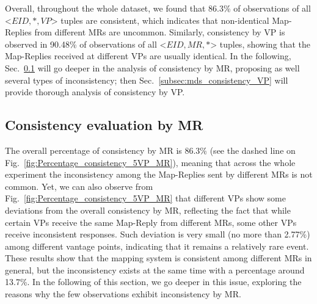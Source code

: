 Overall, throughout the whole dataset, we found that 86.3\% of observations of all <$EID, *, VP$> tuples are consistent, which indicates that non-identical Map-Replies from different MRs are uncommon. Similarly, consistency by VP is observed in 90.48\% of observations of all <$EID, MR, * $> tuples, showing that the Map-Replies received at different VPs are usually identical. In the following, Sec.~\ref{subsec:mds_consistency_MR} will go deeper in the analysis of consistency by MR, proposing as well several types of inconsistency; then Sec.~\ref{subsec:mds_consistency_VP} will provide thorough analysis of consistency by VP.


\subsection{Consistency evaluation by MR}
\label{subsec:mds_consistency_MR}

The overall percentage of consistency by MR is 86.3\% (see the dashed line on Fig.~\ref{fig:Percentage_consistency_5VP_MR}), meaning that across the whole experiment the inconsistency among the Map-Replies sent by different MRs is not common. Yet, we can also observe from Fig.~\ref{fig:Percentage_consistency_5VP_MR} that different VPs show some deviations from the overall consistency by MR, reflecting the fact that while certain VPs receive the same Map-Reply from different MRs, some other VPs receive inconsistent responses. Such deviation is very small (no more than 2.77\%) among different vantage points, indicating that it remains a relatively rare event. These results show that the mapping system is consistent among different MRs in general, but the inconsistency exists at the same time with a percentage around 13.7\%.  In the following of this section, we go deeper in this issue, exploring the reasons why the few observations exhibit
inconsistency by MR.


